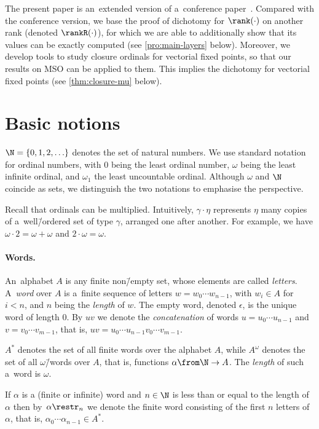 The present paper is an~extended version of a~conference paper~\cite{dichotomy-stacs}. Compared with the conference version, we base the proof of dichotomy for $\rank(\cdot)$ on another rank (denoted $\rankR(\cdot)$), for which we are able to additionally show that its values can be exactly computed (see \cref{pro:main-layers} below). Moreover, we develop tools to study closure ordinals for vectorial fixed points, so that our results on MSO can be applied to them. This implies the dichotomy for vectorial fixed points (see \cref{thm:closure-mu} below).



\section{Basic notions}\label{sec:basic}

$\N=\{0,1,2,\ldots\}$ denotes the set of natural numbers.
We use standard notation for ordinal numbers, with $0$ being the least ordinal number, $\omega$ being the least infinite ordinal, and $\omega_1$ the least uncountable ordinal.
Although $\omega$ and $\N$ coincide as sets, we distinguish the two notations to emphasise the perspective.

Recall that ordinals can be multiplied.
Intuitively, $\gamma\cdot\eta$ represents $\eta$ many copies of a~well\=/ordered set of type $\gamma$, arranged one after another.
For example, we have $\omega\cdot 2=\omega+\omega$ and $2\cdot\omega=\omega$.


\paragraph*{Words.}
An~alphabet $A$ is any finite non\=/empty set, whose elements are called \emph{letters}.
A~\emph{word} over $A$ is a~finite sequence of letters $w=w_0\cdots w_{n-1}$, with $w_i\in A$ for $i <n$, and $n$ being the \emph{length} of $w$.
The empty word, denoted $\epsilon$, is the unique word of length $0$.
By $u v$ we denote the \emph{concatenation} of words $u=u_0\cdots u_{n-1}$ and $v=v_0\cdots v_{m-1}$, that is, $u v = u_0\cdots u_{n-1} v_0\cdots v_{m-1}$.

$A^\ast$ denotes the set of all finite words over the alphabet $A$, while $A^\omega$ denotes the set of all $\omega$\=/words over $A$, that is, functions $\alpha\from \N\to A$.
The \emph{length} of such a~word is $\omega$.

If $\alpha$ is a (finite or infinite) word and $n\in\N$ is less than or equal to the length of $\alpha$ then by~$\alpha\restr_n$
we denote the finite word consisting of the first $n$ letters of $\alpha$, that is, $\alpha_0\cdots\alpha_{n-1}\in A^\ast$.


